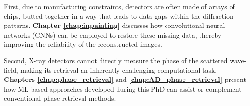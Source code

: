First, due to manufacturing constraints, detectors are often made of arrays of chips, butted together in a way that 
leads to data gaps within the diffraction patterns. \textbf{Chapter \ref{chap:inpainting}} discusses how convolutional neural networks 
(CNNs) can be employed to restore these missing data, thereby improving the reliability of the reconstructed images.

Second, X-ray detectors cannot directly measure the phase of the scattered wave-field, making its retrieval an inherently 
challenging computational task. \textbf{Chapters \ref{chap:phase_retrieval}} and \textbf{\ref{chap:AD_phase_retrieval}} 
present how ML-based approaches developed during this PhD can assist or complement conventional phase retrieval methods. 
